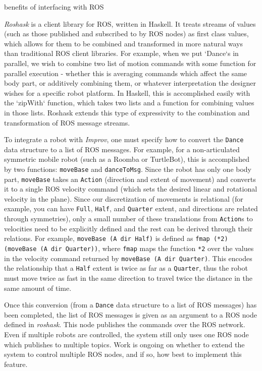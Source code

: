 \documentclass[sigconf]{acmart}
\begin{document}
{\color{red}benefits of interfacing with ROS}


\emph{Roshask} is a client library for ROS, written in Haskell. It treats streams of values (such as those published
and subscribed to by ROS nodes) as first class values, which allows for them to
be combined and transformed in more natural ways than traditional ROS client
libraries. For example, when we put `Dance`s in parallel, we wish to combine two
list of motion commands with some function for parallel execution - whether this
is averaging commands which affect the same body part, or additively combining
them, or whatever interpretation the designer wishes for a specific robot
platform. In Haskell, this is accomplished easily with the
`zipWith` function, which takes two lists and a function for combining values in
those lists. Roshask extends this type of expressivity to the combination and
transformation of ROS message streams.

To integrate a robot with \emph{Improv}, one must
specify how to convert the \texttt{Dance} data structure to a list of ROS
messages. For example, for a non-articulated symmetric mobile robot (such as a Roomba or
TurtleBot), this is accomplished by two functions: \texttt{moveBase} and
\texttt{danceToMsg}. Since the robot has only one body part, \texttt{moveBase}
takes an \texttt{Action} (direction and extent of movement) and converts it to a
single ROS velocity command (which sets the desired linear and rotational
velocity in the plane). Since our discretization of movements is relational (for
example, you can have \texttt{Full}, \texttt{Half}, and \texttt{Quarter} extent,
and directions are related through symmetries), only a small number of these
translations from \texttt{Action}s to velocities need to be explicitly defined
and the rest can be derived through their relations. For example,
\texttt{moveBase (A dir Half)} is defined as \texttt{fmap (*2) (moveBase (A dir
Quarter))},
where \texttt{fmap} maps the function \texttt{*2} over the values in the velocity
command returned by \texttt{moveBase (A dir Quarter)}. This encodes the relationship
that a \texttt{Half} extent is twice as far as a \texttt{Quarter}, thus the
robot must move twice as fast in the same direction to travel twice the distance
in the same amount of time.

Once this conversion (from a \texttt{Dance} data structure to a list of ROS messages)
has been completed, the list of ROS messages is given as an argument to a ROS
node defined in \emph{roshask}. This node publishes the commands over the ROS network.
Even if multiple robots are controlled, the system still only uses one ROS node
which publishes to multiple topics. Work is ongoing on whether to extend the
system to control multiple ROS nodes, and if so, how best to implement this
feature.
\end{document}
